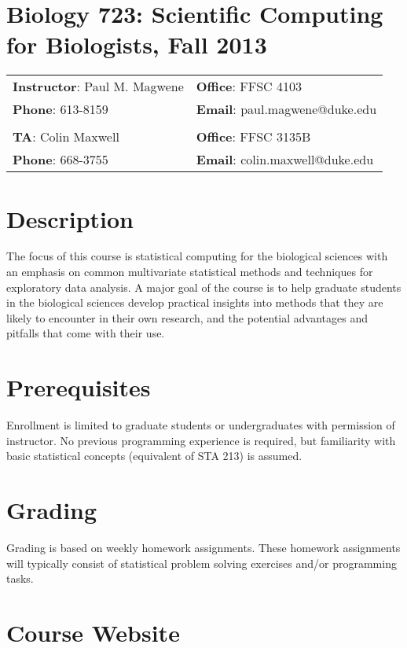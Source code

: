 \documentclass[11pt,letterpaper]{article}
\begin{document}
\section*{\centering Biology 723: Scientific Computing for Biologists, Fall 2013}
\begin{center}
\begin{tabular}{ll}
\textbf{Instructor}: Paul M. Magwene & \textbf{Office}: FFSC 4103\\
\textbf{Phone}: 613-8159 & \textbf{Email}: paul.magwene@duke.edu\\
&\\
\textbf{TA}: Colin Maxwell & \textbf{Office}: FFSC 3135B\\
\textbf{Phone}: 668-3755 & \textbf{Email}: colin.maxwell@duke.edu\\
\end{tabular}
\end{center}

\section*{Description}

The focus of this course is statistical computing for the biological sciences with an emphasis on common multivariate statistical methods and techniques for exploratory data analysis. A major goal of the course is to help graduate students in the biological sciences develop practical insights into methods that they are likely to encounter in their own research, and the potential advantages and pitfalls that come with their use.

\section*{Prerequisites}

Enrollment is limited to graduate students or undergraduates with permission of instructor. No previous programming experience is required, but familiarity with basic statistical concepts (equivalent of STA 213) is assumed.

\section*{Grading}
Grading is based on weekly homework assignments. These homework assignments will typically consist of statistical problem solving exercises and/or programming tasks.

\section*{Course Website}
\end{document}
